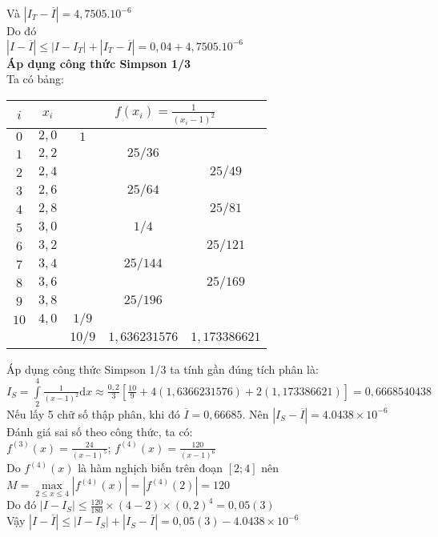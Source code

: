 Và $\left|I_T- \overline{I} \right| = 4,7505.10^{-6}$\\
Do đó\\
$\left| I - \overline{I} \right| \leq \left|I - I_T\right| + \left|I_T - \overline{I}\right| = 0,04 + 4,7505.10^{-6}$\\
\textbf{Áp dụng công thức Simpson 1/3}\\
Ta có bảng:\\
\begin{center}\begin{tabular}{|c|c|c|c|c|}
	\hline
	$i$ & $x_i$ & \multicolumn{3}{|c|}{$f\left(x_i\right)=\frac{1}{\left(x_i - 1 \right)^2}$}\\ \hline
	$0$ & $2,0$ & $1$ & &\\ \hline
	$1$ & $2,2$ & & $25/36$ &\\ \hline
	$2$ & $2,4$ & & & $25/49$ \\ \hline
	$3$ & $2,6$ & & $25/64$ & \\ \hline
	$4$ & $2,8$ & & & $25/81$ \\ \hline
	$5$ & $3,0$ & & $1/4$ & \\ \hline
	$6$ & $3,2$ & & & $25/121$ \\ \hline
	$7$ & $3,4$ & & $25/144$ &\\ \hline
	$8$ & $3,6$ & & & $25/169$ \\ \hline
	$9$ & $3,8$ & & $25/196$ & \\ \hline
	$10$ & $4,0$ & $1/9$ & & \\ \hline
	& & $10/9$ & $1,636231576$ & $1,173386621$ \\ \hline
\end{tabular}\end{center}
Áp dụng công thức Simpson 1/3 ta tính gần đúng tích phân là:\\
$I_S=\int\limits^{4}_{2} \frac{1}{\left(x-1\right)^2}\mathrm{d}x \approx \frac{0,2}{3} \left[ \frac{10}{9} + 4\left(1,6366231576\right)+ 2\left(1,173386621\right) \right]=0,6668540438$\\
Nếu lấy 5 chữ số thập phân, khi đó $\overline{I}=0,66685$. Nên $\left| I_S - \overline{I} \right| = 4.0438\times 10^{-6}$\\
Đánh giá sai số theo công thức, ta có:\\
$f^{\left(3\right)}\left(x\right) =\frac{24}{\left(x-1\right)^5}$; $f^{\left(4\right)}\left(x\right)=\frac{120}{\left(x-1\right)^6}$\\
Do $f^{\left(4\right)}\left(x\right)$ là hàm nghịch biến trên đoạn $\left[2;4\right]$ nên $M=\underset{2 \leq x \leq 4}{\max} \left| f^{\left(4\right)}\left(x\right) \right| = \left| f^{\left(4\right)}\left(2\right) \right|= 120$\\
Do đó $\left| I - I_{S} \right| \leq \frac{120}{180}\times \left(4-2\right) \times \left(0,2\right)^4=0,05\left(3\right) $\\
Vậy $\left| I-\overline{I}\right| \leq \left| I- I_S\right| + \left|I_S -\overline{I}\right|=0,05\left(3\right) - 4.0438\times 10^{-6}$\\



